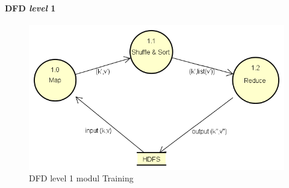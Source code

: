 \paragraph{DFD \textit{level} 1}
\begin{figure}[H]
	\centering
	\includegraphics[scale=0.65]{Diagram/DFD_1_0_Training_Testing}
	\caption[DFD level 1 modul Training]{DFD level 1 modul Training}
	\label{fig:DFD level 1 modul Training}
\end{figure}

